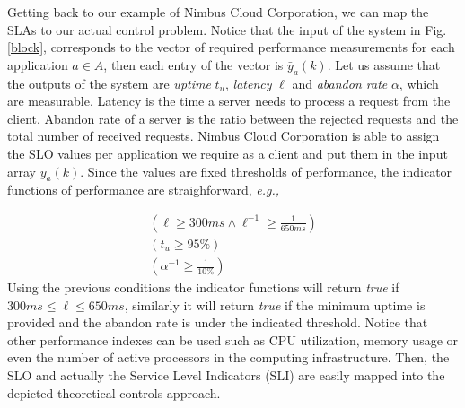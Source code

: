 Getting back to our example of Nimbus Cloud Corporation, we can map the SLAs to our actual control problem. Notice that the input of the system in Fig. \ref{block}, corresponds to
the vector of required performance measurements for each application $a \in A$, then each entry of the vector is $\bar{y}_{a}(k)$. Let us assume that the outputs of the system
are \emph{uptime} $t_{u}$, \emph{latency} $\ell$ and \emph{abandon rate} $\alpha$, which are measurable. Latency is the time a server needs 
to process a request from the client. Abandon rate of a server is the ratio between the rejected requests and the total number of received requests. 
Nimbus Cloud Corporation is able to assign 
the SLO values per application we require as a client and put them in the input array $\bar{y}_{a}(k)$. Since the values are fixed thresholds of performance, the indicator functions of 
performance are straighforward, \emph{e.g.,} 

\begin{eqnarray}
&\left( \ell \geq 300 ms \land \ell^{-1} \geq \frac{1}{650ms} \right)& \nonumber \\
&\left(t_{u} \geq 95\%\right)& \nonumber \\
&\left(\alpha^{-1} \geq \frac{1}{10\%}\right)& \nonumber
\end{eqnarray}
Using the previous conditions the indicator functions will return \emph{true} if $300ms \leq \ell \leq 650ms$, similarly
 it will return \emph{true} if the minimum uptime is provided and the abandon rate is under the indicated threshold. Notice that other performance indexes can be used such as
CPU utilization, memory usage or even the number of active processors in the computing infrastructure. Then, the SLO and 
actually the Service Level Indicators (SLI) are easily mapped into the depicted theoretical controls approach.